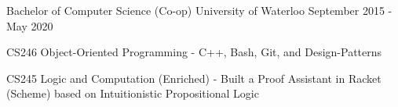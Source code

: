 \begin{cventries}
  \cventry
    {Bachelor of Computer Science (Co-op)}
    {University of Waterloo}
    {September 2015 - May 2020}
    {}
    {
      \begin{cvitems}
        \item {CS246 Object-Oriented Programming - C++, Bash, Git, and Design-Patterns}
        \item {CS245 Logic and Computation (Enriched) - Built a Proof Assistant in Racket (Scheme) based on Intuitionistic Propositional Logic}
      \end{cvitems}
   }
\end{cventries}
